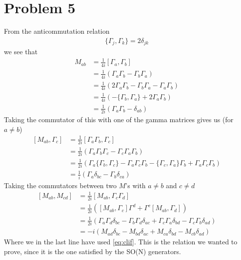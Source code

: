 \documentclass[a4paper,12pt]{article}
\begin{document}
\section*{Problem 5}
From the anticommutation relation
\begin{equation}
	\begin{aligned}
		\{\Gamma_j,\Gamma_k\}=2\delta_{jk}
	\end{aligned}
\end{equation}
we see that
\begin{equation} \label{eq:clif}
	\begin{aligned}
		M_{ab}&=\frac{1}{4i}\left[\Gamma_a,\Gamma_b\right]
		\\
		&=\frac{1}{4i}\left(\Gamma_a\Gamma_b-\Gamma_b\Gamma_a\right)\\
		&=\frac{1}{4i}\left(2\Gamma_a\Gamma_b-\Gamma_b\Gamma_a-\Gamma_a\Gamma_b\right)\\
		&=\frac{1}{4i}\left(-\{\Gamma_b,\Gamma_a\}+2\Gamma_a\Gamma_b\right)\\
			&=\frac{1}{2i}\left(\Gamma_a\Gamma_b-\delta_{ab}\right)
	\end{aligned}
\end{equation}
Taking the commutator of this with one of the gamma matrices gives us (for $a\neq b$)
\begin{equation}
	\begin{aligned}
		\left[M_{ab},\Gamma_c\right]&=\frac{1}{2i}\left[\Gamma_a\Gamma_b,\Gamma_c\right]\\
		&=\frac{1}{2i}\left(\Gamma_a\Gamma_b\Gamma_c-\Gamma_c\Gamma_a\Gamma_b\right)\\
		&=\frac{1}{2i}\left(\Gamma_a\{\Gamma_b,\Gamma_c\}-\Gamma_a\Gamma_c\Gamma_b-\{\Gamma_c,\Gamma_a\}\Gamma_b+\Gamma_a\Gamma_c\Gamma_b\right)\\
		&=\frac{1}{i}\left(\Gamma_a \delta_{bc}-\Gamma_b \delta_{ca}\right)
	\end{aligned}
\end{equation}
Taking the commutators between two $M$'s with $a\neq b$ and $c\neq d$
\begin{equation}
	\begin{aligned}
		\left[M_{ab},M_{cd}\right]&=\frac{1}{2i}\left[M_{ab},\Gamma_{c}\Gamma_{d}\right]\\
		&=\frac{1}{2i}\left(\left[M_{ab},\Gamma_{c}\right]\Gamma^d+\Gamma^c\left[M_{ab},\Gamma_{d}\right]\right)\\
		&=\frac{1}{2i}\left(
		\Gamma_a\Gamma_d\delta_{bc}-\Gamma_b\Gamma_d\delta_{ac}+\Gamma_c\Gamma_a\delta_{bd}-\Gamma_c\Gamma_b\delta_{ad}
		\right)\\
		&=-i\left(M_{ad}\delta_{bc}-M_{bd}\delta_{ac}+M_{ca}\delta_{bd}-M_{cb}\delta_{ad}\right)
	\end{aligned}
\end{equation}
Where we in the last line have used \eqref{eq:clif}. This is the relation we wanted to prove, since it is the one satisfied by the SO(N) generators.
\end{document}
